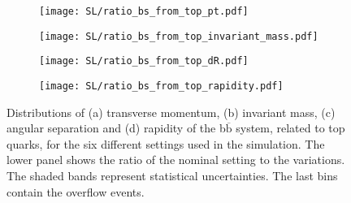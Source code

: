 \begin{figure}[H]
    \centering
    \begin{subfigure}{0.49\textwidth}
        \centering
        \texttt{[image: SL/ratio\_bs\_from\_top\_pt.pdf]}
        \caption{}
        \label{app:subfig:pt(bbbar)_SL}
    \end{subfigure}
    \begin{subfigure}{0.49\textwidth}
        \centering
        \texttt{[image: SL/ratio\_bs\_from\_top\_invariant\_mass.pdf]}
        \caption{}
        \label{app:subfig:m(bbbar)_SL}
    \end{subfigure}

    \vspace{0.2cm}
    
    \begin{subfigure}{0.49\textwidth}
        \centering
        \texttt{[image: SL/ratio\_bs\_from\_top\_dR.pdf]}
        \caption{}
        \label{app:subfig:dR(bbbar)_SL}
    \end{subfigure}
    \begin{subfigure}{0.49\textwidth}
        \centering
        \texttt{[image: SL/ratio\_bs\_from\_top\_rapidity.pdf]}
        \caption{}
        \label{app:subfig:y(bbbar)_SL}
    \end{subfigure}
    \caption{Distributions of (a) transverse momentum, (b) invariant mass,  (c) angular separation and (d) rapidity of the b$\overline{\text{b}}$ system, related to top quarks, for the six different settings used in the simulation. The lower panel shows the ratio of the nominal setting to the variations. The shaded bands represent statistical uncertainties. The last bins contain the overflow events.}
    \label{app:fig:bbbar_SL}
\end{figure}

